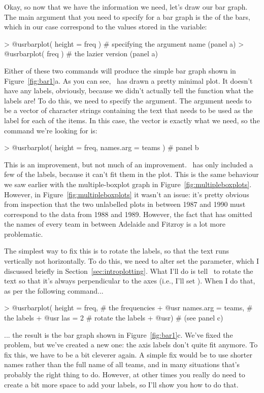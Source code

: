 Okay, so now that we have the information we need, let's draw our bar graph. The main argument that you need to specify for a bar graph is the  of the bars, which in our case correspond to the values stored in the  variable:
\begin{rblock1}
> @usr{barplot( height = freq )}  # specifying the argument name (panel a)
> @usr{barplot( freq )}   # the lazier version (panel a)
\end{rblock1}
Either of these two commands will produce the simple bar graph shown in Figure~\ref{fig:bar1}a. As you can see, \R\ has drawn a pretty minimal plot. It doesn't have any labels, obviously, because we didn't actually tell the  function what the labels are! To do this, we need to specify the  argument. The  argument needs to be a vector of character strings containing the text that needs to be used as the label for each of the items. In this case, the  vector is exactly what we need, so the command we're looking for is:
\begin{rblock1}
> @usr{barplot( height = freq, names.arg = teams )}   # panel b
\end{rblock1}
This is an improvement, but not much of an improvement. \R\ has only included a few of the labels, because it can't fit them in the plot. This is the same behaviour we saw earlier with the multiple-boxplot graph in Figure~\ref{fig:multipleboxplots}. However, in Figure~\ref{fig:multipleboxplots} it wasn't an issue: it's pretty obvious from inspection that the two unlabelled plots in between 1987 and 1990 must correspond to the data from 1988 and 1989. However, the fact that  has omitted the names of every team in between Adelaide and Fitzroy is a lot more problematic. 

The simplest way to fix this is to rotate the labels, so that the text runs vertically not horizontally. To do this, we need to alter set the  parameter, which I discussed briefly in  Section~\ref{sec:introplotting}. What I'll do is tell \R\ to rotate the text so that it's always perpendicular to the axes (i.e., I'll set ). When I do that, as per the following command...
\begin{rblock1}
> @usr{barplot( height = freq, }     # the frequencies 
+ @usr{         names.arg = teams,}  # the labels
+ @usr{         las = 2}             # rotate the labels
+ @usr{)}                            # (see panel c)
\end{rblock1}
... the result is the bar graph shown in Figure~\ref{fig:bar1}c. We've fixed the problem, but we've created a new one:  the axis labels don't quite fit anymore. To fix this, we have to be a bit cleverer again. A simple fix would be to use shorter names rather than the full name of all teams, and in many situations that's probably the right thing to do. However, at other times you really do need to create a bit more space to add your labels, so I'll show you how to do that.

